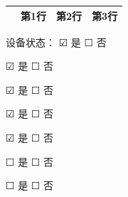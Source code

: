 \documentclass[UTF8,10pt,a4paper,fontset=fandol]{ctexart}
\newcommand{\fieldvalue}[1]{#1}
\newcommand{\checkboxfield}[1]{\ifstrequal{#1}{checked}{☑}{\ifstrequal{#1}{unclear}{?}{☐}}}
\begin{document}
\vspace{1mm}

\noindent
\begin{tabular}{|c|c|c|c|c|c|c|}
\hline
 & \multicolumn{2}{c|}{第1行} & \multicolumn{2}{c|}{第2行} & \multicolumn{2}{c|}{第3行} \\
\hline
\end{tabular}

\noindent
设备状态：
\fieldvalue{\checkboxfield{checked}} 是\quad
\fieldvalue{\checkboxfield{unchecked}} 否

\par\noindent
\fieldvalue{\checkboxfield{checked}} 是\quad
\fieldvalue{\checkboxfield{unchecked}} 否

\par\noindent
\fieldvalue{\checkboxfield{checked}} 是\quad
\fieldvalue{\checkboxfield{unchecked}} 否

\par\noindent
\fieldvalue{\checkboxfield{checked}} 是\quad
\fieldvalue{\checkboxfield{unchecked}} 否

\par\noindent
\fieldvalue{\checkboxfield{checked}} 是\quad
\fieldvalue{\checkboxfield{unchecked}} 否

\par\noindent
\fieldvalue{\checkboxfield{unchecked}} 是\quad
\fieldvalue{\checkboxfield{unchecked}} 否

\par\noindent
\fieldvalue{\checkboxfield{unchecked}} 是\quad
\fieldvalue{\checkboxfield{unchecked}} 否

\vspace{1mm}
\end{document}
